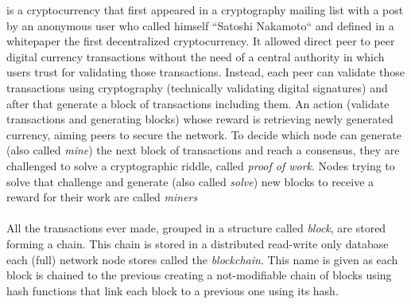 \documentclass[12pt,journal,compsoc]{IEEEtran}
\begin{document}
% 
% 
% 
% 
 is a cryptocurrency that first appeared in a cryptography mailing list\cite{bitcoin-mailing-list-post:online} with a post by an anonymous user who called himself ``Satoshi Nakamoto`` and defined in a whitepaper\cite{bitcoin-whitepaper:online} the first decentralized cryptocurrency. It allowed direct peer to peer digital currency transactions without the need of a central authority in which users trust for validating those transactions. 
Instead, each peer can validate those transactions using cryptography (technically validating digital signatures) and after that generate a block of transactions including them. An action (validate transactions and generating blocks) whose reward is retrieving newly generated currency, aiming peers to secure the network. To decide which node can generate (also called \textit{mine}) the next block of transactions and reach a consensus, they are challenged to solve a cryptographic riddle, called \textit{proof of work}\cite{bitcoin-wiki-proof-of-work:online}. Nodes trying to solve that challenge and generate (also called \textit{solve}) new blocks to receive a reward for their work are called \textit{miners} \\\\
All the transactions ever made, grouped in a structure called \textit{block}, are stored forming a chain. This chain is stored in a distributed read-write only database each (full) network node stores called the \textit{blockchain}. This name is given as each block is chained to the previous creating a not-modifiable chain of blocks using hash functions that link each block to a previous one using its hash.
\end{document}
